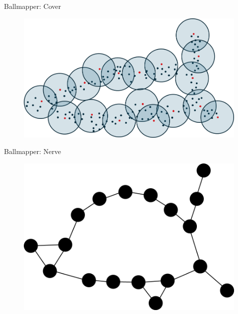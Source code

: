 \documentclass{beamer}
\begin{document}
\begin{frame}{Ballmapper: Cover}
  \begin{figure}
    \begin{center}
      \includegraphics[width=1\textwidth]{ballcover.png}
    \end{center}
  \end{figure}

\end{frame}

\begin{frame}{Ballmapper: Nerve}
  \begin{figure}
    \begin{center}
      \includegraphics[width=1\textwidth]{ballmapperposter.png}
    \end{center}
  \end{figure}
\end{frame}
\end{document}
